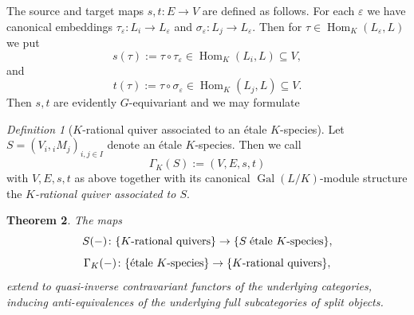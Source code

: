 \documentclass[a4paper,12pt,reqno]{amsart}
\DeclareMathOperator{\Hom}{\mathrm{Hom}}
\DeclareMathOperator{\Gal}{\mathrm {Gal}}
\theoremstyle{plain}
\newtheorem{theorem}{Theorem}[section]
\theoremstyle{remark}
\newtheorem{definition}[theorem]{Definition}
\begin{document}
  The source and target maps $s,t\colon E\to V$ are defined as follows. For each $\varepsilon$ we have canonical embeddings $\tau_\varepsilon\colon L_i\to L_{\varepsilon}$ and $\sigma_\varepsilon\colon L_j\to L_{\varepsilon}$. Then for $\tau\in\Hom_K(L_\varepsilon,L)$ we put
  \begin{equation}
    s(\tau):=\tau\circ\tau_{\varepsilon}\in \Hom_K(L_i,L)\subseteq V,
    \label{eq:tauespilon}
  \end{equation}
  and
  \begin{equation}
  t(\tau):=\tau\circ\sigma_{\varepsilon}\in \Hom_K(L_j,L)\subseteq V.
    \label{eq:sigmaespilon}
  \end{equation}
  Then $s,t$ are evidently $G$-equivariant and we may formulate
  \begin{definition}[{$K$-rational quiver associated to an \'etale $K$-species}]
    Let $S=(V_i,{}_iM_j)_{i,j\in I}$ denote an \'etale $K$-species. Then we call
    \[
    \Gamma_K(S):=(V,E,s,t)
    \]
    with $V,E,s,t$ as above together with its canonical $\Gal(L/K)$-module structure the {\em $K$-rational quiver associated to $S$}.
  \end{definition}

  \begin{theorem}\label{thm:KrationalquiveretaleKspeciesantiequivalence}
    The maps
    \[
    S(-)\colon \{\text{\rm $K$-rational quivers}\}\to\{S\;\text{\rm \'etale $K$-species}\},
    \]
    \[
    \Gamma_K(-)\colon \{\text{\rm \'etale $K$-species}\}\to\{\text{\rm $K$-rational quivers}\},
    \]
    extend to quasi-inverse contravariant functors of the underlying categories, inducing anti-equivalences of the underlying full subcategories of split objects.
  \end{theorem}
\end{document}
